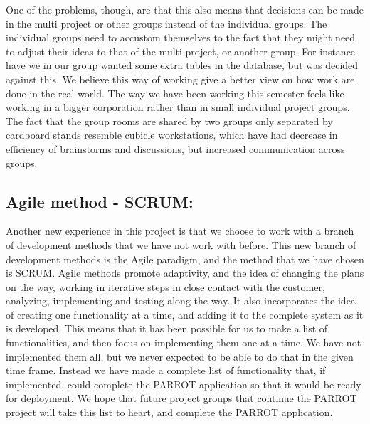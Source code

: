 One of the problems, though, are that this also means that decisions can be made in the multi project or other groups instead of the individual groups.\newline
The individual groups need to accustom themselves to the fact that they might need to adjust their ideas to that of the multi project, or another group. 
For instance have we in our group wanted some extra tables in the database, but was decided against this.\newline
We believe this way of working give a better view on how work are done in the real world. 
The way we have been working this semester feels like working in a bigger corporation rather than in small individual project groups.  
The fact that the group rooms are shared by two groups only separated by cardboard stands resemble cubicle workstations, which have had decrease in efficiency of brainstorms and discussions, but increased communication across groups.\newline
\\

\subsection*{Agile method - SCRUM:}
Another new experience in this project is that we choose to work with a branch of development methods that we have not work with before. 
This new branch of development methods is the Agile paradigm, and the method that we have chosen is SCRUM. 
Agile methods promote adaptivity, and the idea of changing the plans on the way, working in iterative steps in close contact with the customer, analyzing, implementing and testing along the way. 
It also incorporates the idea of creating one functionality at a time, and adding it to the complete system as it is developed. 
This means that it has been possible for us to make a list of functionalities, and then focus on implementing them one at a time.\newline
We have not implemented them all, but we never expected to be able to do that in the given time frame.
Instead we have made a complete list of functionality that, if implemented, could complete the PARROT application so that it would be ready for deployment.
We hope that future project groups that continue the PARROT project will take this list to heart, and complete the PARROT application.\newline

